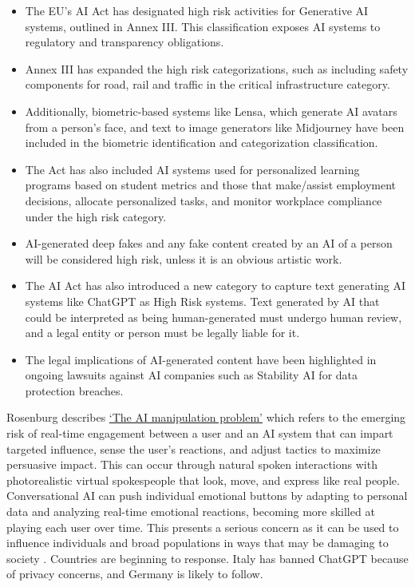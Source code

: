 \begin{itemize}
\item The EU's AI Act has designated high risk activities for Generative AI systems, outlined in Annex III. This classification exposes AI systems to regulatory and transparency obligations.
\item Annex III has expanded the high risk categorizations, such as including safety components for road, rail and traffic in the critical infrastructure category.
\item Additionally, biometric-based systems like Lensa, which generate AI avatars from a person's face, and text to image generators like Midjourney have been included in the biometric identification and categorization classification.
\item The Act has also included AI systems used for personalized learning programs based on student metrics and those that make/assist employment decisions, allocate personalized tasks, and monitor workplace compliance under the high risk category.
\item AI-generated deep fakes and any fake content created by an AI of a person will be considered high risk, unless it is an obvious artistic work.
\item The AI Act has also introduced a new category to capture text generating AI systems like ChatGPT as High Risk systems. Text generated by AI that could be interpreted as being human-generated must undergo human review, and a legal entity or person must be legally liable for it.
\item The legal implications of AI-generated content have been highlighted in ongoing lawsuits against AI companies such as Stability AI for data protection breaches.
\end{itemize}
Rosenburg describes \href{https://bigthink.com/the-present/danger-conversational-ai/}{`The AI manipulation problem'} which refers to the emerging risk of real-time engagement between a user and an AI system that can impart targeted influence, sense the user's reactions, and adjust tactics to maximize persuasive impact. This can occur through natural spoken interactions with photorealistic virtual spokespeople that look, move, and express like real people. Conversational AI can push individual emotional buttons by adapting to personal data and analyzing real-time emotional reactions, becoming more skilled at playing each user over time. This presents a serious concern as it can be used to influence individuals and broad populations in ways that may be damaging to society \cite{Rosenberg2023}. Countries are beginning to response. Italy has banned ChatGPT because of privacy concerns, and Germany is likely to follow.
